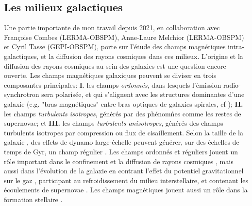 \newpage

\subsection{Les milieux galactiques}

\pg
Une partie importante de mon travail depuis 2021, en collaboration avec Fran\c{c}oise Combes (LERMA-OBSPM), Anne-Laure Melchior (LERMA-OBSPM) et Cyril Tasse (GEPI-OBSPM), porte sur l'\'etude des champs magn\'etiques intra-galactiques, et la diffusion des rayons cosmiques dans ces milieux. L'origine et la diffusion des rayons cosmiques au sein des galaxies est une question encore ouverte. Les champs magn\'etiques galaxiques peuvent se diviser en trois composantes principales: \textbf{I}. les champs \textit{ordonn\'es}, dans lesquels l'\'emission radio-synchrotron sera polaris\'ee, et qui s'alignent avec les structures dominantes d'une galaxie (e.g. "bras magn\'etiques" entre bras optiques de galaxies spirales, cf \cite{1996NAWG.1996..262B}); \textbf{II. } les champs \textit{turbulents isotropes}, g\'en\'er\'es par des ph\'enom\`nes comme les restes de supernovae; et \textbf{III.} les champs \textit{turbulents anisotropes}, g\'en\'er\'es des champs turbulents isotropes par compression ou flux de cisaillement. Selon la taille de la galaxie \cite{2009A&A...494...21A}, des effets de dynamo large-\'echelle peuvent g\'en\'erer, sur des \'echelles de temps de Gyr, un champ r\'egulier \cite{1988ASSL..133.....R}. Les champs ordonn\'es et r\'eguliers jouent un r\^ole important dans le confinement et la diffusion de rayons cosmiques  \cite{2013PhPl...20e5501Z}, mais aussi dans l'\'evolution de la galaxie en contrant l'effet du potentiel gravitationnel sur le gaz \cite{1990ApJ...365..544B}, participant au refroidissement du milieu interstellaire, et contenant les \'ecoulements de supernovae \cite{2019MNRAS.488.5065E}. Les champs magn\'etiques jouent aussi un r\^ole dans la formation stellaire \cite{2019FrASS...6....7K}.

%
%




